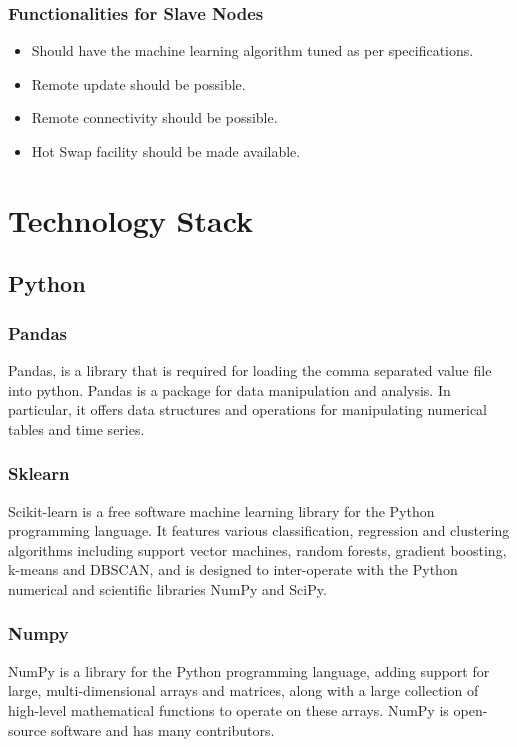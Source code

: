 \documentclass[12pt]{article}
\begin{document}
\subsubsection{Functionalities for Slave Nodes}
\begin{itemize}
\item Should have the machine learning algorithm tuned as per specifications.
\item Remote update should be possible.
\item Remote connectivity should be possible.
\item Hot Swap facility should be made available.
\end{itemize}


\clearpage
\newpage
\section{Technology Stack}
\subsection{Python}
\subsubsection{Pandas}
Pandas, is a library that is required for loading the comma separated value file into python. Pandas is a package for data manipulation and analysis. In particular, it offers data structures and operations for manipulating numerical tables and time series.\cite{pandas}

\subsubsection{Sklearn}
Scikit-learn is a free software machine learning library for the Python programming language. It features various classification, regression and clustering algorithms including support vector machines, random forests, gradient boosting, k-means and DBSCAN, and is designed to inter-operate with the Python numerical and scientific libraries NumPy and SciPy.\cite{scikit}

\subsubsection{Numpy}
NumPy is a library for the Python programming language, adding support for large, multi-dimensional arrays and matrices, along with a large collection of high-level mathematical functions to operate on these arrays. NumPy is open-source software and has many contributors.\cite{numpy}
\end{document}
